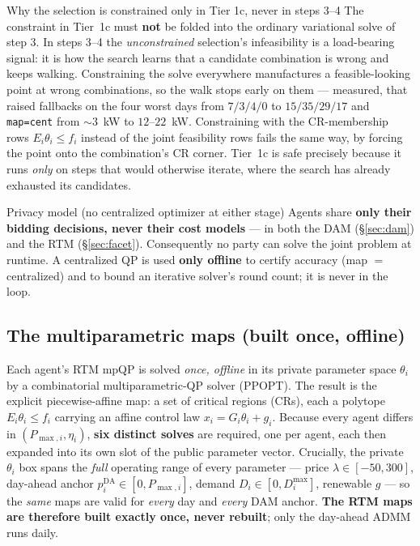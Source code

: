\documentclass[11pt, letterpaper]{article}
\begin{document}
\begin{warnbox}{Why the selection is constrained only in Tier 1c, never in steps 3--4}
The constraint in Tier~1c must \textbf{not} be folded into the ordinary variational solve of step 3.
In steps 3--4 the \emph{unconstrained} selection's infeasibility is a load-bearing signal: it is how
the search learns that a candidate combination is wrong and keeps walking. Constraining the solve
everywhere manufactures a feasible-looking point at wrong combinations, so the walk stops early on
them --- measured, that raised fallbacks on the four worst days from $7/3/4/0$ to $15/35/29/17$ and
\texttt{map=cent} from $\sim\!3$~kW to $12$--$22$~kW. Constraining with the CR-membership rows
$E_i\theta_i\le f_i$ instead of the joint feasibility rows fails the same way, by forcing the point
onto the combination's CR corner. Tier~1c is safe precisely because it runs \emph{only} on steps that
would otherwise iterate, where the search has already exhausted its candidates.
\end{warnbox}

\begin{keybox}{Privacy model (no centralized optimizer at either stage)}
Agents share \textbf{only their bidding decisions, never their cost models} --- in both the DAM
(\S\ref{sec:dam}) and the RTM (\S\ref{sec:facet}). Consequently no party can solve the joint problem
at runtime. A centralized QP is used \textbf{only offline} to certify accuracy (map $=$ centralized)
and to bound an iterative solver's round count; it is never in the loop.
\end{keybox}

\subsection{The multiparametric maps (built once, offline)}
Each agent's RTM mpQP is solved \emph{once, offline} in its private parameter space $\theta_i$ by a
combinatorial multiparametric-QP solver (PPOPT). The result is the explicit piecewise-affine map:
a set of critical regions (CRs), each a polytope $E_i\theta_i\le f_i$ carrying an affine control law
$x_i=G_i\theta_i+g_i$. Because every agent differs in $(P_{\max,i},\eta_i)$, \textbf{six distinct
solves} are required, one per agent, each then expanded into its own slot of the public
parameter vector. Crucially, the private
$\theta_i$ box spans the \emph{full} operating range of every parameter --- price
$\lambda\in[-50,300]$, day-ahead anchor $p^{\mathrm{DA}}_i\in[0,P_{\max,i}]$, demand
$D_i\in[0,D^{\max}_i]$, renewable $g$ --- so the \emph{same} maps are valid for \emph{every} day and
\emph{every} DAM anchor. \textbf{The RTM maps are therefore built exactly once, never rebuilt}; only
the day-ahead ADMM runs daily.
\end{document}
